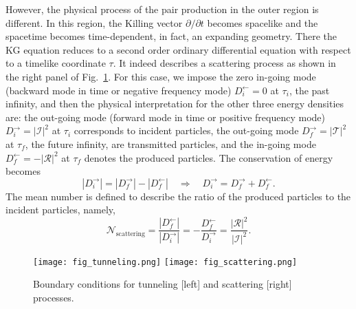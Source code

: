 \documentclass[aps,nofootinbib,superscriptaddress
]{revtex4}
\begin{document}
\begin{appendix}
However, the physical process of the pair production in the outer region is different. In this region, the Killing vector $\partial / \partial t$ becomes spacelike and the spacetime becomes time-dependent, in fact, an expanding geometry. There the KG equation reduces to a second order ordinary differential equation with respect to a timelike coordinate $\tau$. It indeed describes a scattering process as shown in the right panel of Fig.~\ref{fig_BCs}. For this case, we impose the zero in-going mode (backward mode in time or negative frequency mode) $D_i^\leftarrow = 0$ at $\tau_i$, the past infinity, and then the physical interpretation for the other three energy densities are: the out-going mode (forward mode in time or positive frequency mode) $D_i^\rightarrow = |\mathcal{I}|^2$ at $\tau_i$ corresponds to incident particles, the out-going mode $D_f^\rightarrow = |\mathcal{T}|^2$ at $\tau_f$, the future infinity, are transmitted particles, and the in-going mode $D_f^\leftarrow = - |\mathcal{R}|^2$ at $\tau_f$ denotes the produced particles. The conservation of energy becomes
\begin{equation}
| D_i^\rightarrow | = | D_f^\rightarrow | - | D_f^\leftarrow | \quad \Rightarrow \quad D_i^\rightarrow = D_f^\rightarrow + D_f^\leftarrow.
\end{equation}
The mean number is defined to describe the ratio of the produced particles to the incident particles, namely,
\begin{equation}
\mathcal{N}_\mathrm{scattering} = \frac{| D_f^\leftarrow |}{| D_i^\rightarrow |} = - \frac{D_f^\leftarrow}{D_i^\rightarrow}  = \frac{|\mathcal{R}|^2}{|\mathcal{I}|^2}.
\end{equation}


\begin{figure}
\texttt{[image: fig\_tunneling.png]}
\hspace{.5cm}
\texttt{[image: fig\_scattering.png]}
\caption{Boundary conditions for tunneling [left] and scattering [right] processes.}
\label{fig_BCs}
\end{figure}



\end{appendix}
\end{document}

